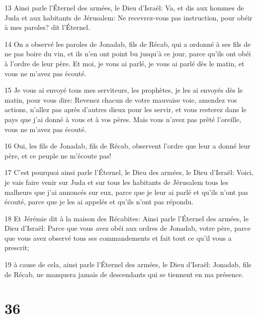 \par 13 Ainsi parle l'Éternel des armées, le Dieu d'Israël: Va, et dis aux hommes de Juda et aux habitants de Jérusalem: Ne recevrez-vous pas instruction, pour obéir à mes paroles? dit l'Éternel.
\par 14 On a observé les paroles de Jonadab, fils de Récab, qui a ordonné à ses fils de ne pas boire du vin, et ils n'en ont point bu jusqu'à ce jour, parce qu'ils ont obéi à l'ordre de leur père. Et moi, je vous ai parlé, je vous ai parlé dès le matin, et vous ne m'avez pas écouté.
\par 15 Je vous ai envoyé tous mes serviteurs, les prophètes, je les ai envoyés dès le matin, pour vous dire: Revenez chacun de votre mauvaise voie, amendez vos actions, n'allez pas après d'autres dieux pour les servir, et vous resterez dans le pays que j'ai donné à vous et à vos pères. Mais vous n'avez pas prêté l'oreille, vous ne m'avez pas écouté.
\par 16 Oui, les fils de Jonadab, fils de Récab, observent l'ordre que leur a donné leur père, et ce peuple ne m'écoute pas!
\par 17 C'est pourquoi ainsi parle l'Éternel, le Dieu des armées, le Dieu d'Israël: Voici, je vais faire venir sur Juda et sur tous les habitants de Jérusalem tous les malheurs que j'ai annoncés sur eux, parce que je leur ai parlé et qu'ils n'ont pas écouté, parce que je les ai appelés et qu'ils n'ont pas répondu.
\par 18 Et Jérémie dit à la maison des Récabites: Ainsi parle l'Éternel des armées, le Dieu d'Israël: Parce que vous avez obéi aux ordres de Jonadab, votre père, parce que vous avez observé tous ses commandements et fait tout ce qu'il vous a prescrit;
\par 19 à cause de cela, ainsi parle l'Éternel des armées, le Dieu d'Israël: Jonadab, fils de Récab, ne manquera jamais de descendants qui se tiennent en ma présence.

\chapter{36}


